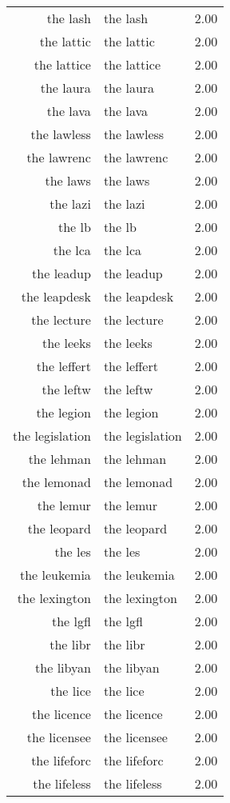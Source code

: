 \begin{table}[ht]
\begin{tabular}{rlr}
  the lash & the lash & 2.00 \\ 
  the lattic & the lattic & 2.00 \\ 
  the lattice & the lattice & 2.00 \\ 
  the laura & the laura & 2.00 \\ 
  the lava & the lava & 2.00 \\ 
  the lawless & the lawless & 2.00 \\ 
  the lawrenc & the lawrenc & 2.00 \\ 
  the laws & the laws & 2.00 \\ 
  the lazi & the lazi & 2.00 \\ 
  the lb & the lb & 2.00 \\ 
  the lca & the lca & 2.00 \\ 
  the leadup & the leadup & 2.00 \\ 
  the leapdesk & the leapdesk & 2.00 \\ 
  the lecture & the lecture & 2.00 \\ 
  the leeks & the leeks & 2.00 \\ 
  the leffert & the leffert & 2.00 \\ 
  the leftw & the leftw & 2.00 \\ 
  the legion & the legion & 2.00 \\ 
  the legislation & the legislation & 2.00 \\ 
  the lehman & the lehman & 2.00 \\ 
  the lemonad & the lemonad & 2.00 \\ 
  the lemur & the lemur & 2.00 \\ 
  the leopard & the leopard & 2.00 \\ 
  the les & the les & 2.00 \\ 
  the leukemia & the leukemia & 2.00 \\ 
  the lexington & the lexington & 2.00 \\ 
  the lgfl & the lgfl & 2.00 \\ 
  the libr & the libr & 2.00 \\ 
  the libyan & the libyan & 2.00 \\ 
  the lice & the lice & 2.00 \\ 
  the licence & the licence & 2.00 \\ 
  the licensee & the licensee & 2.00 \\ 
  the lifeforc & the lifeforc & 2.00 \\ 
  the lifeless & the lifeless & 2.00 \\ 

\end{tabular}
\end{table}
